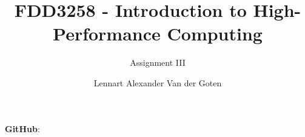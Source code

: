 \documentclass{kthreport}
\title{FDD3258 - Introduction to High-Performance Computing}
\subtitle{Assignment III}
\author{Lennart Alexander Van der Goten}
\begin{document}
\maketitle
\textbf{GitHub}:
\section{}
\section{}
\subsection{}
\subsection{}
\subsection{}
\subsection{}
\subsection{}
\section{}
\end{document}
